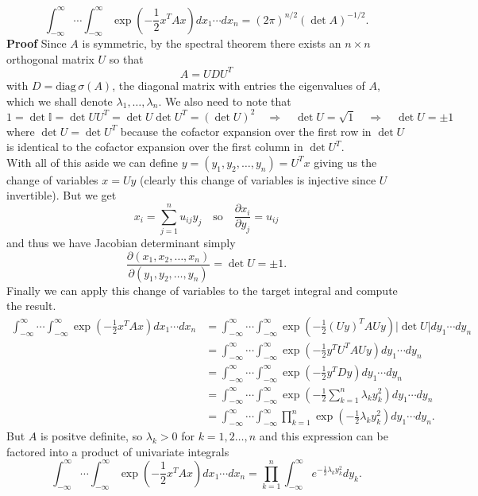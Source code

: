 \documentclass[11pt, letterpaper]{article}
\newcommand{\mbb}[1]{\mathbb{#1}}
\begin{document}
    \[\int_{-\infty}^\infty\cdots\int_{-\infty}^\infty\exp\left(-\frac{1}{2}x^TAx\right)dx_1\cdots dx_n=(2\pi)^{n/2}(\det A)^{-1/2}.\] 
    {\bf Proof} Since $A$ is symmetric, by the spectral theorem there exists an $n\times n$ orthogonal matrix $U$ so that
    \[A=UDU^{T}\]
    with $D=\text{diag}\,\sigma(A)$, the diagonal matrix with entries the eigenvalues of $A$, which we shall denote $\lambda_1,\dots,\lambda_n$. We also need to note that
    \[1=\det\mbb{I}=\det UU^T=\det U\det U^T=(\det U)^2\quad\Rightarrow\quad\det U=\sqrt{1}\quad\Rightarrow\quad \det U =\pm 1\]
    where $\det U=\det U^T$ because the cofactor expansion over the first row in $\det U$ is identical to the cofactor expansion over the first column in $\det U^T$.\\[10pt]
    With all of this aside we can define $y=(y_1,y_2,\dots,y_n)=U^Tx$ giving us the change of variables $x=Uy$ (clearly this change of variables is injective since $U$ invertible). But we get 
    \[x_i=\sum_{j=1}^nu_{ij}y_j\quad\text{so}\quad\frac{\partial x_i}{\partial y_j}=u_{ij}\]
    and thus we have Jacobian determinant simply
    \[\frac{\partial(x_1,x_2,\dots,x_n)}{\partial(y_1,y_2,\dots,y_n)}=\det U=\pm1.\]
    Finally we can apply this change of variables to the target integral and compute the result.
    \begin{align*}
        \int_{-\infty}^\infty\cdots\int_{-\infty}^\infty\exp\left(-\frac{1}{2}x^TAx\right)dx_1\cdots dx_n&=\int_{-\infty}^\infty\cdots\int_{-\infty}^\infty\exp\left(-\frac{1}{2}(Uy)^TAUy\right)|\det U|dy_1\cdots dy_n\\
        &=\int_{-\infty}^\infty\cdots\int_{-\infty}^\infty\exp\left(-\frac{1}{2}y^TU^TAUy\right)dy_1\cdots dy_n\\
        &=\int_{-\infty}^\infty\cdots\int_{-\infty}^\infty\exp\left(-\frac{1}{2}y^TDy\right)dy_1\cdots dy_n\\
        &=\int_{-\infty}^\infty\cdots\int_{-\infty}^\infty\exp\left(-\frac{1}{2}\sum_{k=1}^n\lambda_ky_k^2\right)dy_1\cdots dy_n\\
        &=\int_{-\infty}^\infty\cdots\int_{-\infty}^\infty\prod_{k=1}^n\exp\left(-\frac{1}{2}\lambda_ky_k^2\right)dy_1\cdots dy_n.
    \end{align*}
    But $A$ is positve definite, so $\lambda_k>0$ for $k=1,2\dots, n$ and this expression can be factored into a product of univariate integrals
    \[\int_{-\infty}^\infty\cdots\int_{-\infty}^\infty\exp\left(-\frac{1}{2}x^TAx\right)dx_1\cdots dx_n=\prod_{k=1}^n\int_{-\infty}^\infty e^{-\frac{1}{2}\lambda_ky_k^2}dy_k.\]
\end{document}
